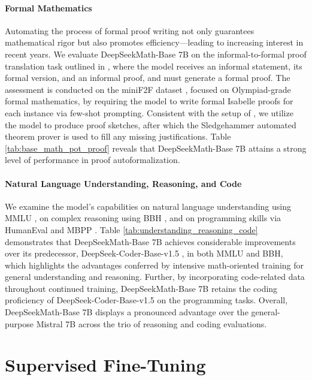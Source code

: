 \begin{itemize}[topsep=0pt]
\paragraph{Formal Mathematics}

Automating the process of formal proof writing not only guarantees mathematical rigor but also promotes efficiency—leading to increasing interest in recent years. We evaluate DeepSeekMath-Base 7B on the informal-to-formal proof translation task outlined in \citep{dsp_proof}, where the model receives an informal statement, its formal version, and an informal proof, and must generate a formal proof. The assessment is conducted on the miniF2F dataset \citep{minif2f}, focused on Olympiad-grade formal mathematics, by requiring the model to write formal Isabelle proofs for each instance via few-shot prompting. Consistent with the setup of \cite{dsp_proof}, we utilize the model to produce proof sketches, after which the Sledgehammer automated theorem prover \citep{sledgehammer} is used to fill any missing justifications. Table \ref{tab:base_math_pot_proof} reveals that DeepSeekMath-Base 7B attains a strong level of performance in proof autoformalization.

\paragraph{Natural Language Understanding, Reasoning, and Code}

We examine the model’s capabilities on natural language understanding using MMLU \citep{mmlu}, on complex reasoning using BBH \citep{bbh}, and on programming skills via HumanEval \citep{codex} and MBPP \citep{mbpp}. Table \ref{tab:understanding_reasoning_code} demonstrates that DeepSeekMath-Base 7B achieves considerable improvements over its predecessor, DeepSeek-Coder-Base-v1.5 \citep{deepseek-coder}, in both MMLU and BBH, which highlights the advantages conferred by intensive math-oriented training for general understanding and reasoning. Further, by incorporating code-related data throughout continued training, DeepSeekMath-Base 7B retains the coding proficiency of DeepSeek-Coder-Base-v1.5 on the programming tasks. Overall, DeepSeekMath-Base 7B displays a pronounced advantage over the general-purpose Mistral 7B \citep{mistral} across the trio of reasoning and coding evaluations.

\section{Supervised Fine-Tuning}


\end{itemize}
